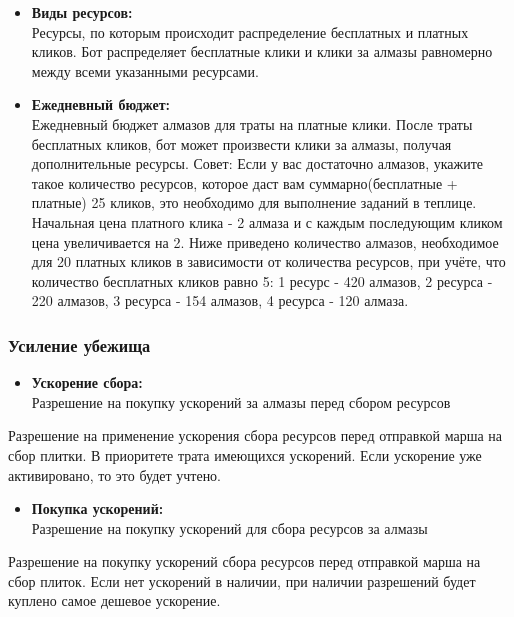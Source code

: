\documentclass[
]{article}
\providecommand{\tightlist}{%
  \setlength{\itemsep}{0pt}\setlength{\parskip}{0pt}}
\begin{document}
\begin{itemize}
\item
  \textbf{Виды ресурсов:}\\
  Ресурсы, по которым происходит распределение бесплатных и платных
  кликов. Бот распределяет бесплатные клики и клики за алмазы равномерно
  между всеми указанными ресурсами.
\item
  \textbf{Ежедневный бюджет:}\\
  Ежедневный бюджет алмазов для траты на платные клики. После траты
  бесплатных кликов, бот может произвести клики за алмазы, получая
  дополнительные ресурсы. Совет: Если у вас достаточно алмазов, укажите
  такое количество ресурсов, которое даст вам суммарно(бесплатные +
  платные) 25 кликов, это необходимо для выполнение заданий в теплице.
  Начальная цена платного клика - 2 алмаза и с каждым последующим кликом
  цена увеличивается на 2. Ниже приведено количество алмазов,
  необходимое для 20 платных кликов в зависимости от количества
  ресурсов, при учёте, что количество бесплатных кликов равно 5: 1
  ресурс - 420 алмазов, 2 ресурса - 220 алмазов, 3 ресурса - 154
  алмазов, 4 ресурса - 120 алмаза.
\end{itemize}

\subsubsection{Усиление
убежища}\label{ux443ux441ux438ux43bux435ux43dux438ux435-ux443ux431ux435ux436ux438ux449ux430}

\begin{itemize}
\tightlist
\item
  \textbf{Ускорение сбора:}\\
  Разрешение на покупку ускорений за алмазы перед сбором ресурсов
\end{itemize}

Разрешение на применение ускорения сбора ресурсов перед отправкой марша
на сбор плитки. В приоритете трата имеющихся ускорений. Если ускорение
уже активировано, то это будет учтено.

\begin{itemize}
\tightlist
\item
  \textbf{Покупка ускорений:}\\
  Разрешение на покупку ускорений для сбора ресурсов за алмазы
\end{itemize}

Разрешение на покупку ускорений сбора ресурсов перед отправкой марша на
сбор плиток. Если нет ускорений в наличии, при наличии разрешений будет
куплено самое дешевое ускорение.
\end{document}
